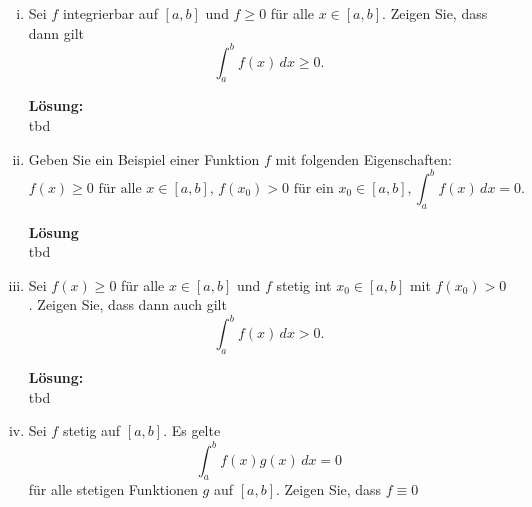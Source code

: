 \documentclass[11pt,a4paper,ngerman]{article}
\begin{document}
\begin{enumerate}[i)]
    \item Sei $f$ integrierbar auf $[a,b]$ und $f\geq 0$ für alle $x \in [a,b]$. Zeigen Sie, dass dann gilt
$$
    \int_{a}^{b} f(x) \, dx \geq 0.
$$

\textbf{Lösung:}\\

tbd

    \item Geben Sie ein Beispiel einer Funktion $f$ mit folgenden Eigenschaften:
$$
    f(x) \geq 0 \text{ für alle } x\in [a,b], \, f(x_0) > 0\text { für ein } x_0 \in [a,b], \int_{a}^{b} f(x) \, dx = 0.
$$

\textbf{Lösung}\\

tbd

    \item Sei $f(x) \geq 0$ für alle $x \in [a,b]$ und $f$ stetig int $x_0 \in [a,b]$ mit $f(x_0) > 0$. Zeigen Sie, dass dann auch gilt
$$
    \int_{a}^{b} f(x) \, dx > 0.
$$

\textbf{Lösung:}\\

tbd

    \item Sei $f$ stetig auf $[a,b]$. Es gelte
$$
\int_{a}^{b} f(x)g(x) \, dx = 0
$$
für alle stetigen Funktionen $g$ auf $[a,b]$. Zeigen Sie, dass $f\equiv 0$
\end{enumerate}
\label{LastPage}
\end{document}
